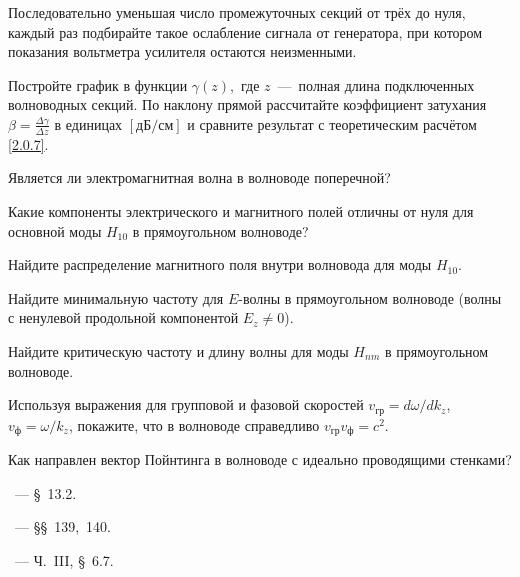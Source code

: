 \begin{lab:task}
    \item Последовательно уменьшая число промежуточных секций от трёх до нуля,
    каждый раз подбирайте такое ослабление сигнала от генератора, при котором
    показания вольтметра усилителя остаются неизменными.
    
    \item Постройте график в функции $\gamma(z),$ где $z$~---~полная длина
    подключенных волноводных секций. По наклону прямой рассчитайте коэффициент
    затухания $\beta=\frac{\Delta\gamma}{\Delta z}$ 
    в единицах $[\text{дБ}/\text{см}]$ и сравните результат с теоретическим
    расчётом \eqref{2.0.7}.
 \end{lab:task}


\begin{lab:questions} 
    
    \item Является ли электромагнитная волна в волноводе поперечной?
    
    \item Какие компоненты электрического и магнитного полей отличны от нуля
для основной моды $H_{10}$ в прямоугольном волноводе?

    \item Найдите распределение магнитного поля внутри волновода для моды $H_{10}$.

    \item Найдите минимальную частоту для $E$-волны в прямоугольном волноводе (волны с ненулевой
    продольной компонентой $E_z\ne 0$).
    
    \item Найдите критическую частоту и длину волны для моды $H_{nm}$ в прямоугольном волноводе.
    
    \item Используя выражения для групповой и фазовой
    скоростей $v_{гр}=d\omega/dk_z$, $v_{\text{ф}}=\omega/k_z$, покажите, что в
    волноводе справедливо $v_{гр}v_{\text{ф}}=c^2$.
    
    \item Как направлен вектор Пойнтинга в волноводе с идеально проводящими стенками?
\end{lab:questions}


\begin{lab:literature} 
    \item \Kirichenko~--- \S~13.2.
    
    \item \SivuhinIII~--- \S\S~139,~140.
    
    \item \KingLokOlh~--- Ч.~III, \S~6.7.
        
\end{lab:literature}
